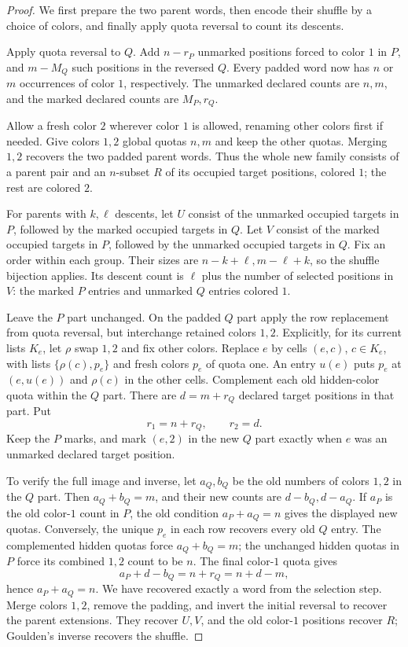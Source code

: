 \begin{proof}
We first prepare the two parent words, then encode their shuffle by a
choice of colors, and finally apply quota reversal to count its descents.

Apply quota reversal to $Q$. Add $n-r_P$ unmarked positions forced to
color $1$ in $P$, and $m-M_Q$ such positions in the reversed $Q$.
Every padded word now has $n$ or $m$ occurrences of color $1$,
respectively. The unmarked declared counts are $n,m$, and the marked
declared counts are $M_P,r_Q$.

Allow a fresh color $2$ wherever color $1$ is allowed, renaming other
colors first if needed. Give colors $1,2$ global quotas $n,m$ and keep
the other quotas. Merging $1,2$ recovers the two padded parent words.
Thus the whole new family consists of a parent pair and an $n$-subset
$R$ of its occupied target positions, colored $1$; the rest are colored $2$.

For parents with $k,\ell$ descents, let $U$ consist of the unmarked
occupied targets in $P$, followed by the marked occupied targets in $Q$.
Let $V$ consist of the marked occupied targets in $P$, followed by the
unmarked occupied targets in $Q$. Fix an order within each group.
Their sizes are $n-k+\ell,m-\ell+k$, so the shuffle bijection applies.
Its descent count is $\ell$ plus the number of selected positions in $V$:
the marked $P$ entries and unmarked $Q$ entries colored $1$.

Leave the $P$ part unchanged. On the padded $Q$ part apply the row
replacement from quota reversal, but interchange retained colors $1,2$.
Explicitly, for its current lists $K_e$, let $\rho$ swap $1,2$ and fix
other colors. Replace $e$ by cells $(e,c)$, $c\in K_e$, with lists
$\{\rho(c),p_e\}$ and fresh colors $p_e$ of quota one. An entry $u(e)$
puts $p_e$ at $(e,u(e))$ and $\rho(c)$ in the other cells.
Complement each old hidden-color quota within the $Q$ part.
There are $d=m+r_Q$ declared target positions in that part. Put
\[
 r_1=n+r_Q,\qquad r_2=d.
\]
Keep the $P$ marks, and mark $(e,2)$ in the new $Q$ part exactly when
$e$ was an unmarked declared target position.

To verify the full image and inverse, let $a_Q,b_Q$ be the old numbers
of colors $1,2$ in the $Q$ part. Then $a_Q+b_Q=m$, and their new counts
are $d-b_Q,d-a_Q$. If $a_P$ is the old color-$1$ count in $P$, the
old condition $a_P+a_Q=n$ gives the displayed new quotas.
Conversely, the unique $p_e$ in each row recovers every old $Q$ entry.
The complemented hidden quotas force $a_Q+b_Q=m$; the unchanged hidden
quotas in $P$ force its combined $1,2$ count to be $n$.
The final color-$1$ quota gives
\[
 a_P+d-b_Q=n+r_Q=n+d-m,
\]
hence $a_P+a_Q=n$. We have recovered exactly a word from the selection
step. Merge colors $1,2$, remove the padding, and invert the initial
reversal to recover the parent extensions. They recover $U,V$, and the
old color-$1$ positions recover $R$; Goulden's inverse recovers the shuffle.


\end{proof}
